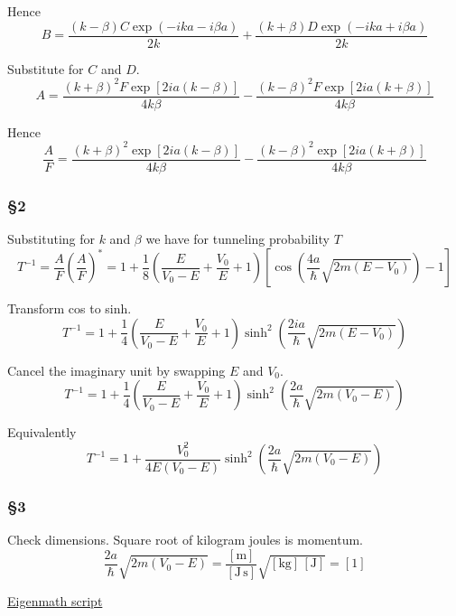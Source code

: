 Hence
\begin{equation*}
B=\frac{(k-\beta)C\exp(-ika-i\beta a)}{2k}+\frac{(k+\beta)D\exp(-ika+i\beta a)}{2k}
\end{equation*}

\fi

Substitute for $C$ and $D$.
\begin{equation*}
A=\frac{(k+\beta)^2F\exp[2ia(k-\beta)]}{4k\beta}
-\frac{(k-\beta)^2F\exp[2ia(k+\beta)]}{4k\beta}
\end{equation*}

Hence
\begin{equation*}
\frac{A}{F}=\frac{(k+\beta)^2\exp[2ia(k-\beta)]}{4k\beta}
-\frac{(k-\beta)^2\exp[2ia(k+\beta)]}{4k\beta}
\tag{5}
\end{equation*}

\subsubsection*{\S2}

Substituting for $k$ and $\beta$ we have for tunneling probability $T$
\begin{equation*}
T^{-1}=\frac{A}{F}\left(\frac{A}{F}\right)^*
=1+\frac{1}{8}\left(\frac{E}{V_0-E}+\frac{V_0}{E}+1\right)
\left[\cos\left(\frac{4a}{\hbar}\sqrt{2m(E-V_0)}\right)-1\right]
\tag{6}
\end{equation*}

Transform cos to sinh.
\begin{equation*}
T^{-1}=1+\frac{1}{4}\left(\frac{E}{V_0-E}+\frac{V_0}{E}+1\right)
\sinh^2\left(\frac{2ia}{\hbar}\sqrt{2m(E-V_0)}\right)
\tag{7}
\end{equation*}

Cancel the imaginary unit by swapping $E$ and $V_0$.
\begin{equation*}
T^{-1}=1+\frac{1}{4}\left(\frac{E}{V_0-E}+\frac{V_0}{E}+1\right)
\sinh^2\left(\frac{2a}{\hbar}\sqrt{2m(V_0-E)}\right)
\end{equation*}

Equivalently
\begin{equation*}
T^{-1}=1+\frac{V_0^2}{4E(V_0-E)}\sinh^2\left(\frac{2a}{\hbar}\sqrt{2m(V_0-E)}\right)
\tag{8}
\end{equation*}

\subsubsection*{\S3}

Check dimensions.
Square root of kilogram joules is momentum.
\begin{equation*}
\frac{2a}{\hbar}\sqrt{2m(V_0-E)}=\frac{[\text{m}]}{[\text{J}\,\text{s}]}
\sqrt{[\text{kg}]\,[\text{J}]}=[1]
\tag{9}
\end{equation*}

\href{https://georgeweigt.github.io/examples/tunneling-demo.html}{Eigenmath script}


